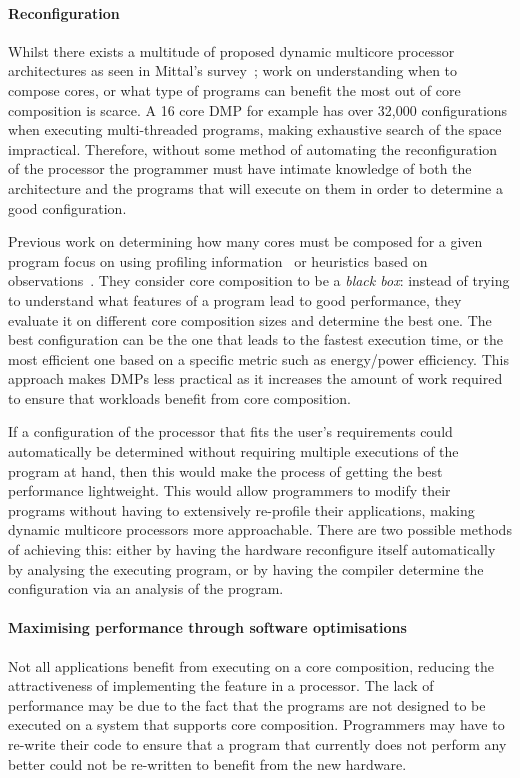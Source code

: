 \paragraph*{Reconfiguration}
Whilst there exists a multitude of proposed dynamic multicore processor architectures as seen in Mittal's survey~\cite{MittalSurv2016}; work on understanding when to compose cores, or what type of programs can benefit the most out of core composition is scarce.
A 16 core DMP for example has over 32,000 configurations when executing multi-threaded programs, making exhaustive search of the space impractical.
Therefore, without some method of automating the reconfiguration of the processor the programmer must have intimate knowledge of both the architecture and the programs that will execute on them in order to determine a good configuration.

Previous work on determining how many cores must be composed for a given program focus on using profiling information~\cite{pricopiSchedCoreComp2014} or heuristics based on observations~\cite{gulati2008multitaskingdmc}.
They consider core composition to be a \textit{black box}: instead of trying to understand what features of a program lead to good performance, they evaluate it on different core composition sizes and determine the best one.
The best configuration can be the one that leads to the fastest execution time, or the most efficient one based on a specific metric such as energy/power efficiency.
This approach makes DMPs less practical as it increases the amount of work required to ensure that workloads benefit from core composition.

If a configuration of the processor that fits the user's requirements could automatically be determined without requiring multiple executions of the program at hand, then this would make the process of getting the best performance lightweight.
This would allow programmers to modify their programs without having to extensively re-profile their applications, making dynamic multicore processors more approachable.
There are two possible methods of achieving this: either by having the hardware reconfigure itself automatically by analysing the executing program, or by having the compiler determine the configuration via an analysis of the program.

\paragraph*{Maximising performance through software optimisations}
Not all applications benefit from executing on a core composition, reducing the attractiveness of implementing the feature in a processor.
The lack of performance may be due to the fact that the programs are not designed to be executed on a system that supports core composition.
Programmers may have to re-write their code to ensure that a program that currently does not perform any better could not be re-written to benefit from the new hardware.

